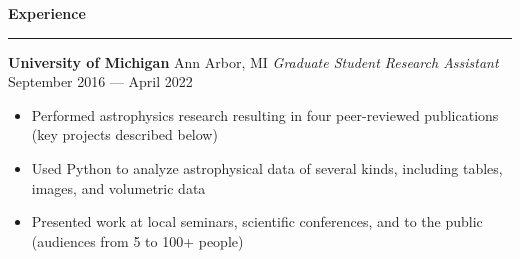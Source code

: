\documentclass[10pt]{article}
\newcommand{\header}[1]{\vspace{0.7em}\par \textbf{\large #1}\strut\hrule\vspace{-0.6em}}
\newcommand{\actionHeader}[2]{\vspace{0.3em}\textbf{#1} \hfill #2}
\newcommand{\actionHeaderSecondLine}[2]{\newline \textit{#1} \hfill #2}
\begin{document}
\header{Experience}
\actionHeader{University of Michigan}{Ann Arbor, MI}
\actionHeaderSecondLine{Graduate Student Research Assistant}{September 2016 --- April 2022}
\begin{itemize}
    \item Performed astrophysics research resulting in four peer-reviewed publications (key projects described below)
    \item Used Python to analyze astrophysical data of several kinds, including tables, images, and volumetric data
    \item Presented work at local seminars, scientific conferences, and to the public (audiences from 5 to 100+ people)
\end{itemize}

\end{document}
